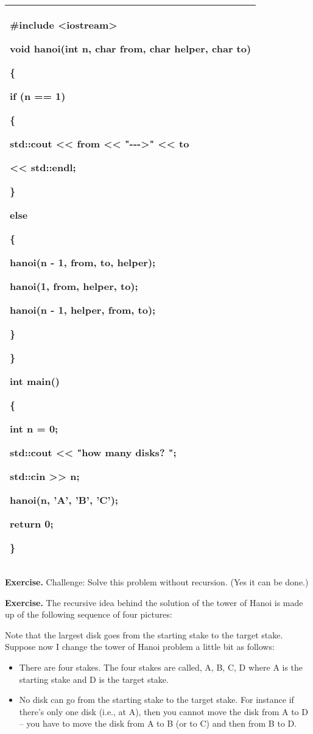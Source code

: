 \documentclass[
]{article}
\providecommand{\tightlist}{%
  \setlength{\itemsep}{0pt}\setlength{\parskip}{0pt}}
\begin{document}
\begin{longtable}[]{@{}l@{}}
\toprule
\endhead
\begin{minipage}[t]{0.97\columnwidth}\raggedright
\#include \textless iostream\textgreater{}

void hanoi(int n, char from, char helper, char to)

\{

if (n == 1)

\{

std::cout \textless\textless{} from \textless\textless{}
"-\/-\/-\textgreater" \textless\textless{} to

\textless\textless{} std::endl;

\}

else

\{

hanoi(n - 1, from, to, helper);

hanoi(1, from, helper, to);

hanoi(n - 1, helper, from, to);

\}

\}

int main()

\{

int n = 0;

std::cout \textless\textless{} "how many disks? ";

std::cin \textgreater\textgreater{} n;

hanoi(n, 'A', 'B', 'C');

return 0;

\}\strut
\end{minipage}\tabularnewline
\bottomrule
\end{longtable}

\textbf{Exercise.} Challenge: Solve this problem without recursion. (Yes
it can be done.)

\textbf{Exercise.} The recursive idea behind the solution of the tower
of Hanoi is made up of the following sequence of four pictures:

Note that the largest disk goes from the starting stake to the target
stake. Suppose now I change the tower of Hanoi problem a little bit as
follows:

\begin{itemize}
\tightlist
\item
  There are four stakes. The four stakes are called, A, B, C, D where A
  is the starting stake and D is the target stake.
\item
  No disk can go from the starting stake to the target stake. For
  instance if there's only one disk (i.e., at A), then you cannot move
  the disk from A to D -- you have to move the disk from A to B (or to
  C) and then from B to D.
\end{itemize}
\end{document}
